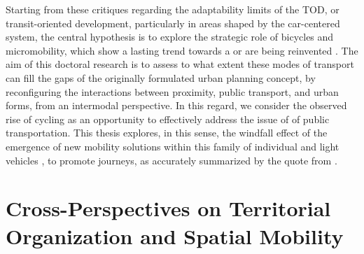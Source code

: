 \begin{refsegment}
Starting from these critiques regarding the adaptability limits of the \acrshort{TOD}, or transit-oriented development, particularly in areas shaped by the car-centered system, the central hypothesis is to explore the strategic role of bicycles and \gls{micromobility}, which show a lasting trend towards a  \textcolor{blue}{\autocites[137-168]{heran_retour_2015}[3-28]{dusong_dynamiques_2021}[44]{eskenazi_voir_2022}} or are being reinvented \textcolor{blue}{\autocite[18]{amar_homo_2016}}. The aim of this doctoral research is to assess to what extent these modes of transport can fill the gaps of the originally formulated urban planning concept, by reconfiguring the interactions between proximity, public transport, and urban forms, from an intermodal perspective. In this regard, we consider the observed rise of cycling as an opportunity to effectively address the issue of  of public transportation. This thesis explores, in this sense, the windfall effect of the emergence of new mobility solutions within this family of individual and light vehicles \textcolor{blue}{\autocite[77]{oostendorp_combining_2018}}, to promote  journeys, as accurately summarized by the quote from \textcolor{blue}{\textcite[164-168]{bruntlett_curbing_2020}}.%

\section*{Cross-Perspectives on Territorial Organization and Spatial Mobility
    \label{introduction-generale:regards-croises-organisation-territoriale-mobilite-spatiale}
    }


\end{refsegment}
